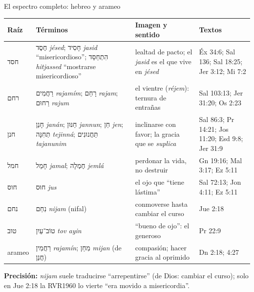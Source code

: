 \documentclass[hyperref={bookmarks=false},aspectratio=169]{beamer}
\newcommand{\heb}[1]{\mbox{\foreignlanguage{hebrew}{#1}}}
\newcommand{\precision}[1]{{\footnotesize\color{gris}\textbf{Precisión:} #1}}
\begin{document}
\begin{frame}{El espectro completo: hebreo y arameo}
\scriptsize\renewcommand{\arraystretch}{1.13}
\begin{tabular}{@{}>{\RaggedRight\arraybackslash}p{1.0cm}>{\RaggedRight\arraybackslash}p{3.6cm}>{\RaggedRight\arraybackslash}p{3.7cm}>{\RaggedRight\arraybackslash}p{3.3cm}@{}}
\toprule
\textbf{Raíz} & \textbf{Términos} & \textbf{Imagen y sentido} & \textbf{Textos} \\ \midrule
\heb{חסד} & \heb{חֶסֶד} \emph{jésed}; \heb{חָסִיד} \emph{jasid} ``misericordioso''; \heb{הִתְחַסֵּד} \emph{hitjassed} ``mostrarse misericordioso'' & lealtad de pacto; el \emph{jasid} es el que vive en \emph{jésed} & Éx 34:6; Sal 136; Sal 18:25; Jer 3:12; Mi 7:2 \\
\heb{רחם} & \heb{רַחֲמִים} \emph{rajamím}; \heb{רָחַם} \emph{rajam}; \heb{רַחוּם} \emph{rajum} & el vientre (\emph{réjem}): ternura de entrañas & Sal 103:13; Jer 31:20; Os 2:23 \\
\heb{חנן} & \heb{חָנַן} \emph{janán}; \heb{חַנּוּן} \emph{jannun}; \heb{חֵן} \emph{jen}; \heb{תְּחִנָּה} \emph{tejinná}; \heb{תַּחֲנוּנִים} \emph{tajanunim} & inclinarse con favor; la gracia que se \emph{suplica} & Sal 86:3; Pr 14:21; Jos 11:20; Esd 9:8; Jer 31:9 \\
\heb{חמל} & \heb{חָמַל} \emph{jamal}; \heb{חֶמְלָה} \emph{jemlá} & perdonar la vida, no destruir & Gn 19:16; Mal 3:17; Ez 5:11 \\
\heb{חוס} & \heb{חוּס} \emph{jus} & el ojo que ``tiene lástima'' & Sal 72:13; Jon 4:11; Ez 5:11 \\
\heb{נחם} & \heb{נִחַם} \emph{nijam} (nifal) & conmoverse hasta cambiar el curso & Jue 2:18 \\
\heb{טוב} & \heb{טוֹב־עַיִן} \emph{tov ayin} & ``bueno de ojo'': el generoso & Pr 22:9 \\
arameo & \heb{רַחֲמִין} \emph{rajamín}; \heb{מִחַן} \emph{mijan} (de \heb{חֲנַן}) & compasión; hacer gracia al oprimido & Dn 2:18; 4:27 \\
\bottomrule
\end{tabular}\par\smallskip
\precision{\emph{nijam} suele traducirse ``arrepentirse'' (de Dios: cambiar el curso); solo en Jue 2:18 la RVR1960 lo vierte ``era movido a misericordia''.}
\end{frame}
\end{document}
